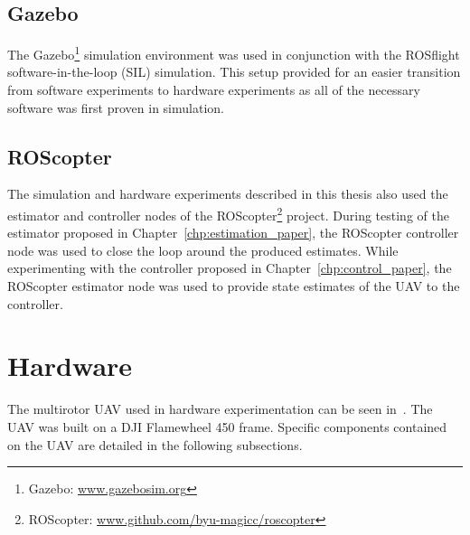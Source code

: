 \subsection {Gazebo}
The Gazebo\footnote{Gazebo:
\url{www.gazebosim.org}}
simulation environment was used
in conjunction
with the ROSflight software-in-the-loop
(SIL) simulation.
This setup provided for an easier transition from software
experiments to
hardware experiments as all of the necessary software was first proven in
simulation.


\subsection {ROScopter}
The simulation and hardware experiments described in this thesis also used
the estimator and controller nodes of the ROScopter\footnote{ROScopter:
\url{www.github.com/byu-magicc/roscopter}}
project.
During testing of the estimator proposed in
Chapter~\ref{chp:estimation_paper}, the ROScopter controller node was used to
close the loop around the produced estimates.
While experimenting with the
controller proposed in Chapter~\ref{chp:control_paper}, the ROScopter estimator node
was used to provide state estimates of the UAV to the controller.

\section{Hardware}
The multirotor UAV used in hardware experimentation can be seen
in~. The UAV was built on a DJI Flamewheel 450 frame.
Specific components contained on the UAV are detailed in the following
subsections.

